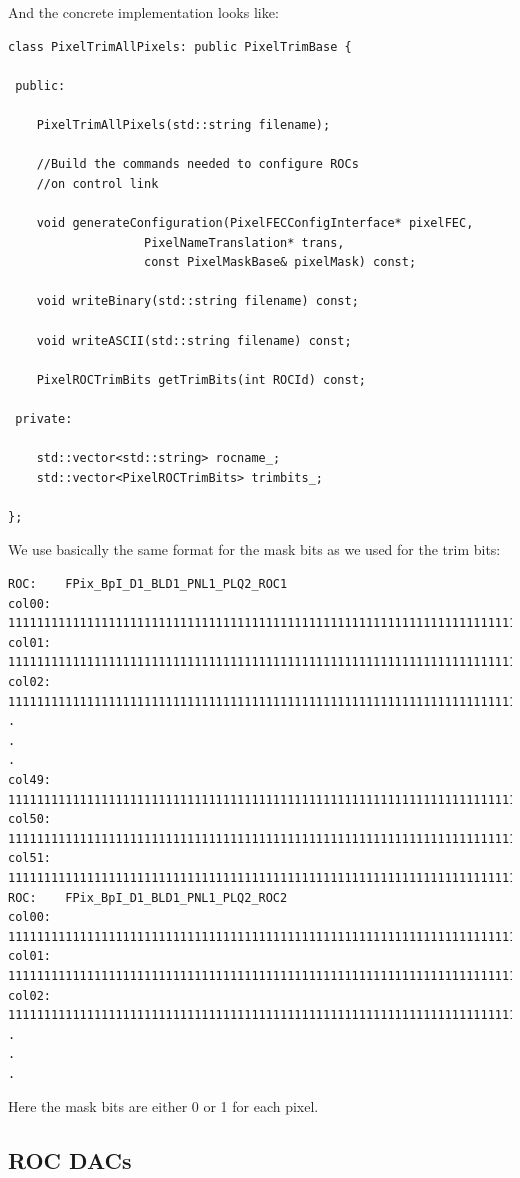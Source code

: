 And the concrete implementation looks like:

\begin{verbatim}
class PixelTrimAllPixels: public PixelTrimBase {

 public:

    PixelTrimAllPixels(std::string filename);

    //Build the commands needed to configure ROCs
    //on control link

    void generateConfiguration(PixelFECConfigInterface* pixelFEC,
			       PixelNameTranslation* trans,
			       const PixelMaskBase& pixelMask) const;

    void writeBinary(std::string filename) const;

    void writeASCII(std::string filename) const;

    PixelROCTrimBits getTrimBits(int ROCId) const;

 private:

    std::vector<std::string> rocname_;
    std::vector<PixelROCTrimBits> trimbits_;

};
\end{verbatim}

We use basically the same format for the mask bits as we used for the
trim bits:

\begin{verbatim}
ROC:    FPix_BpI_D1_BLD1_PNL1_PLQ2_ROC1
col00:  11111111111111111111111111111111111111111111111111111111111111111111111110000000
col01:  11111111111111111111111111111111111111111111111111111111111111111111111111111111
col02:  11111111111111111111111111111111111111111111111111111111111111111111111111111111
.
.
.
col49:  11111111111111111111111111111111111111111111111111111111111111111111111111111111
col50:  11111111111111111111111111111111111111111111111111111111111111111111111111111111
col51:  11111111111111111111111111111111111111111111111111111111111111111111111111111111
ROC:    FPix_BpI_D1_BLD1_PNL1_PLQ2_ROC2
col00:  11111111111111111111111111111111111111111111111111111111111111111111111111111111
col01:  11111111111111111111111111111111111111111111111111111111111111111111111111111111
col02:  11111111111111111111111111111111111111111111111111111111111111111111111111111111
.
.
.
\end{verbatim}
Here the mask bits are either 0 or 1 for each pixel.

\subsection{ROC DACs}

